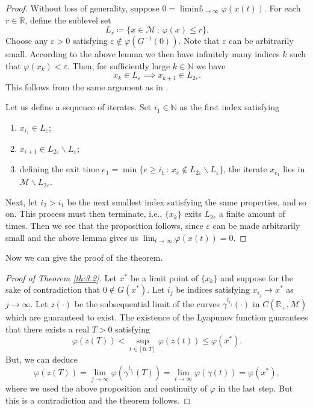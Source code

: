 \documentclass{article}
\newcommand{\CM}{\mathcal{M}}
\newcommand{\BR}{\mathbb{R}}
\newcommand{\BN}{\mathbb{N}}
\begin{document}
\begin{proof}
    Without loss of generality, suppose $0=\liminf_{t\to\infty}\varphi(x(t))$. For each $r\in\BR$, define the sublevel set
    \begin{equation}
        L_r\coloneqq \{x\in\CM\,:\,\varphi(x)\leq r\}.
    \end{equation}
    Choose any $\varepsilon>0$ satisfying $\varepsilon\notin \varphi(G^{-1}(0))$. Note that $\varepsilon$ can be arbitrarily small. According to the above lemma we then have infinitely many indices $k$ such that $\varphi(x_k)<\varepsilon$. Then, for sufficiently large $k\in\BN$ we have
    \begin{equation}
        x_k\in L_\varepsilon\implies x_{k+1}\in L_{2\varepsilon}.
    \end{equation}
    This follows from the same argument as in \cite{davis2020stochastic}. 

    Let us define a sequence of iterates. Set $i_1\in \BN$ as the first index satisfying
    \begin{enumerate}
        \item $x_{i_1}\in L_\varepsilon$;
        \item $x_{i+1}\in L_{2\varepsilon}\backslash L_\varepsilon$;
        \item defining the exit time $e_1=\min\{e\geq i_1\,:\, x_e\notin L_{2\varepsilon}\backslash L_\varepsilon\}$, the iterate $x_{e_1}$ lies in $\CM\backslash L_{2\varepsilon}$.
    \end{enumerate}
    Next, let $i_2>i_1$ be the next smallest index satisfying the same properties, and so on. This process must then terminate, i.e., $\{x_k\}$ exits $L_{2\varepsilon}$ a finite amount of times. Then we see that the proposition follows, since $\varepsilon$ can be made arbitrarily small and the above lemma gives us $\lim_{t\to\infty}\varphi(x(t))=0$. 
\end{proof}

Now we can give the proof of the theorem. 

\begin{proof}[Proof of Theorem \ref{th:3.2}]
    Let $x^*$ be a limit point of $\{x_k\}$ and suppose for the sake of contradiction that $0\notin G(x^*)$. Let $i_j$ be indices satisfying $x_{i_j}\to x^*$ as $j\to\infty$. Let $z(\cdot)$ be the subsequential limit of the curves $\gamma^{t_{i_j}}(\cdot)$ in $C(\BR_+,\CM)$ which are guaranteed to exist. The existence of the Lyapunov function guarantees that there exists a real $T>0$ satisfying
    \begin{equation}
        \varphi(z(T))<\sup_{t\in[0,T]}\varphi(z(t))\leq \varphi(x^*).
    \end{equation}
    But, we can deduce
    \begin{equation}
        \varphi(z(T))=\lim_{j\to\infty}\varphi(\gamma^{t_{i_j}}(T))=\lim_{t\to\infty}\varphi(\gamma(t))=\varphi(x^*),
    \end{equation}
    where we used the above proposition and continuity of $\varphi$ in the last step. But this is a contradiction and the theorem follows. 
\end{proof} 
\end{document}
